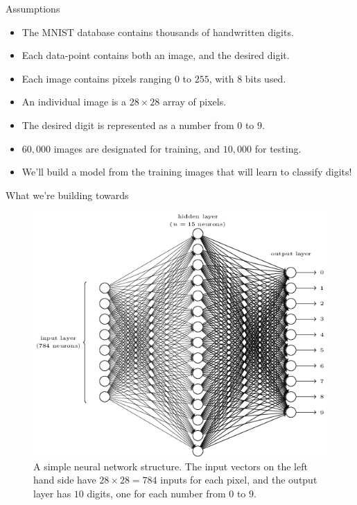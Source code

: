 \documentclass[xcolor=dvipsnames, fontsize=11pt, %
pagesize, %
parskip=half-, t]{beamer}
\begin{document}
\begin{frame}[c]{Assumptions}
\begin{itemize}
\item The MNIST database contains thousands of handwritten digits.  \pause 
\item Each data-point contains both an image, and the desired digit. \pause 
\item Each image contains pixels ranging $0$ to $255$, with $8$ bits used. 
\item  An individual image is a $28\times 28$ array of pixels.\pause  
\item The desired digit is represented as a number from $0$ to $9$. \pause 
\item $60,000$ images are designated for training, and $10,000$ for testing. \pause 
\item We'll build a model from the training images that will learn to classify digits!
\end{itemize}
\end{frame}

\begin{frame}{What we're building towards}
\begin{figure}
\center
\includegraphics[scale=0.36]{goal.png}
\caption{A simple neural network structure. The input vectors on the left hand side have $28\times 28=784$ inputs for each pixel, and the output layer has $10$ digits, one for each number from $0$ to $9$.}
\end{figure}
\end{frame}
\end{document}
